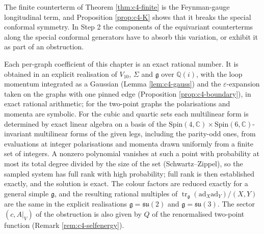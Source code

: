 The finite counterterm of Theorem \ref{thm:c4-finite} is the Feynman-gauge longitudinal term, and Proposition \ref{prop:c4-K} shows that it breaks the special conformal symmetry. In Step 2 the components of the equivariant counterterms along the special conformal generators have to absorb this variation, or exhibit it as part of an obstruction.

\begin{remark}
\label{rem:c4-method}
Each per-graph coefficient of this chapter is an exact rational number. It is obtained in an explicit realisation of $V_{10}$, $\Sigma$ and $\mathfrak g$ over $\mathbb Q(i)$, with the loop momentum integrated as a Gaussian (Lemma \ref{lem:c4-gauss}) and the $\varepsilon$-expansion taken on the graphs with one pinned edge (Proposition \ref{prop:c4-boundary}), in exact rational arithmetic; for the two-point graphs the polarisations and momenta are symbolic. For the cubic and quartic sets each multilinear form is determined by exact linear algebra on a basis of the $\mathrm{Spin}(4,\mathbb C)\times\mathrm{Spin}(6,\mathbb C)$-invariant multilinear forms of the given legs, including the parity-odd ones, from evaluations at integer polarisations and momenta drawn uniformly from a finite set of integers. A nonzero polynomial vanishes at such a point with probability at most its total degree divided by the size of the set (Schwartz--Zippel), so the sampled system has full rank with high probability; full rank is then established exactly, and the solution is exact. The colour factors are reduced exactly for a general simple $\mathfrak g$, and the resulting rational multiples of $\operatorname{tr}_{\mathfrak g}(\mathrm{ad}_X\mathrm{ad}_Y)/(X,Y)$ are the same in the explicit realisations $\mathfrak g=\mathfrak{su}(2)$ and $\mathfrak g=\mathfrak{su}(3)$. The sector $(c,A|_V)$ of the obstruction is also given by $Q$ of the renormalised two-point function (Remark \ref{rem:c4-selfenergy}).
\end{remark}
